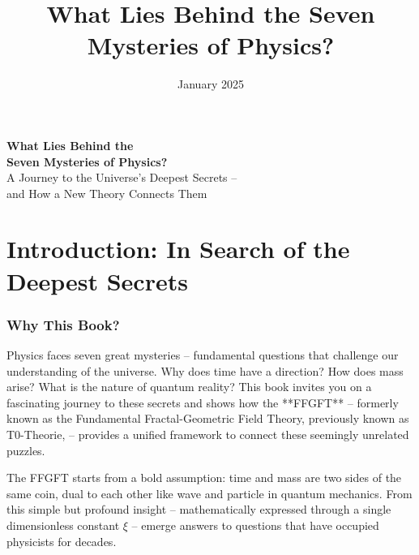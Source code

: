 \documentclass[11pt,oneside]{book}
\title{What Lies Behind the Seven Mysteries of Physics?}
\author{}
\date{January 2025}
\begin{document}
	\let\cleardoublepage\clearpage
	
	\setcounter{section}{0}
	\setcounter{subsection}{0}
	\setcounter{subsubsection}{0}
	\setcounter{paragraph}{0}
	
	\setcounter{secnumdepth}{1}  %
	\begin{center}
	\vspace*{2cm}
	{\Huge\textbf{What Lies Behind the\\Seven Mysteries of Physics?}}\\[1.5cm]
	{\Large A Journey to the Universe's Deepest Secrets –\\and How a New Theory Connects Them}\\[2cm]
\end{center}
	
	\frontmatter
	\pagestyle{empty}
	
	\mainmatter
	\pagestyle{plain}
	
	\tableofcontents
	
	
	

	
	
	\chapter*{Introduction: In Search of the Deepest Secrets}
	
	\subsection*{Why This Book?}
	
	Physics faces seven great mysteries – fundamental questions that challenge our understanding of the universe. Why does time have a direction? How does mass arise? What is the nature of quantum reality? This book invites you on a fascinating journey to these secrets and shows how the **FFGFT** – formerly known as the Fundamental Fractal-Geometric Field Theory, previously known as  T0-Theorie, – provides a unified framework to connect these seemingly unrelated puzzles.
	
	The FFGFT starts from a bold assumption: time and mass are two sides of the same coin, dual to each other like wave and particle in quantum mechanics. From this simple but profound insight – mathematically expressed through a single dimensionless constant \(\xi\) – emerge answers to questions that have occupied physicists for decades.
	
\end{document}

